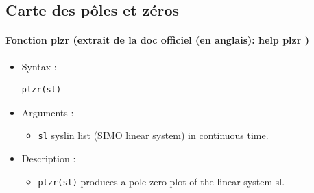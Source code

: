 \subsection{Carte des pôles et zéros}
\begin{doc}
\paragraph{Fonction plzr (extrait de la doc officiel (en anglais): help plzr )}
\begin{itemize}
    \item Syntax :
\begin{code}
\begin{verbatim}
plzr(sl)
\end{verbatim}
\end{code}
    \item Arguments :
    \begin{itemize}
        \item \verb?sl? syslin list (SIMO linear system) in continuous time.
    \end{itemize}
    \item Description :
    \begin{itemize}
        \item \verb?plzr(sl)? produces a pole-zero plot of the linear system sl.
    \end{itemize}
\end{itemize}
\end{doc}

